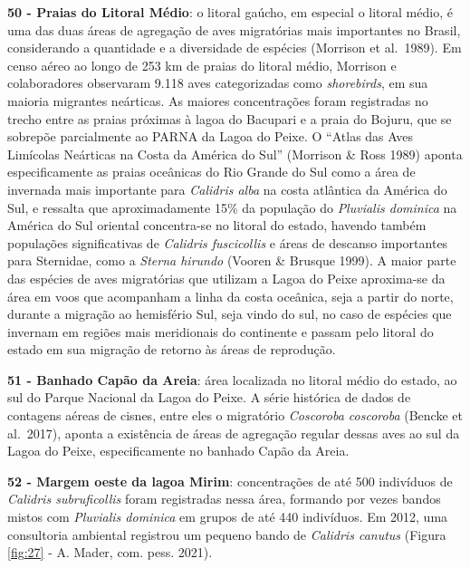 \documentclass[
  oneside]{scrbook}
\begin{document}
\textbf{50 - Praias do Litoral Médio}: o litoral gaúcho, em especial o litoral médio, é uma das duas áreas de agregação de aves migratórias mais importantes no Brasil, considerando a quantidade e a diversidade de espécies (Morrison et al.~1989). Em censo aéreo ao longo de 253 km de praias do litoral médio, Morrison e colaboradores observaram 9.118 aves categorizadas como \emph{shorebirds}, em sua maioria migrantes neárticas. As maiores concentrações foram registradas no trecho entre as praias próximas à lagoa do Bacupari e a praia do Bojuru, que se sobrepõe parcialmente ao PARNA da Lagoa do Peixe. O ``Atlas das Aves Limícolas Neárticas na Costa da América do Sul'' (Morrison \& Ross 1989) aponta especificamente as praias oceânicas do Rio Grande do Sul como a área de invernada mais importante para \emph{Calidris alba} na costa atlântica da América do Sul, e ressalta que aproximadamente 15\% da população do \emph{Pluvialis dominica} na América do Sul oriental concentra-se no litoral do estado, havendo também populações significativas de \emph{Calidris fuscicollis} e áreas de descanso importantes para Sternidae, como a \emph{Sterna hirundo} (Vooren \& Brusque 1999). A maior parte das espécies de aves migratórias que utilizam a Lagoa do Peixe aproxima-se da área em voos que acompanham a linha da costa oceânica, seja a partir do norte, durante a migração ao hemisfério Sul, seja vindo do sul, no caso de espécies que invernam em regiões mais meridionais do continente e passam pelo litoral do estado em sua migração de retorno às áreas de reprodução.

\textbf{51 - Banhado Capão da Areia}: área localizada no litoral médio do estado, ao sul do Parque Nacional da Lagoa do Peixe. A série histórica de dados de contagens aéreas de cisnes, entre eles o migratório \emph{Coscoroba coscoroba} (Bencke et al.~2017), aponta a existência de áreas de agregação regular dessas aves ao sul da Lagoa do Peixe, especificamente no banhado Capão da Areia.

\textbf{52 - Margem oeste da lagoa Mirim}: concentrações de até 500 indivíduos de \emph{Calidris subruficollis} foram registradas nessa área, formando por vezes bandos mistos com \emph{Pluvialis dominica} em grupos de até 440 indivíduos. Em 2012, uma consultoria ambiental registrou um pequeno bando de \emph{Calidris canutus} (Figura \ref{fig:27} - A. Mader, com. pess. 2021).
\end{document}
